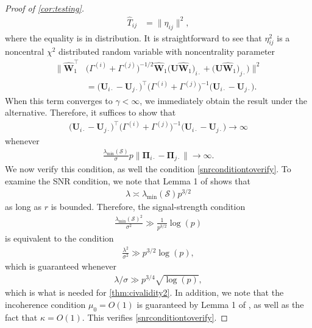 \documentclass[10pt]{article}
\newcommand{\0}{{\mathbf{0}}}
\newcommand{\1}{{\mathbf{1}}}
\newcommand{\U}{{\mathbf{U}}}
\renewcommand{\citet}{\cite}
\renewcommand{\t}{^{\top}}
\renewcommand{\hat}{\widehat}
\renewcommand{\hat}{\widehat}
\begin{document}
\begin{proof}[Proof of \cref{cor:testing}]
\begin{align*}
    \hat T_{ij} &= \| \eta_{ij}  \|^2,
\end{align*}
where the equality is in distribution.  It is straightforward to see that $\eta_{ij}^2$ is a noncentral $\chi^2$ distributed random variable with noncentrality parameter
\begin{align*}
    \|   \mathbf{\hat W}_{1}\t &\bigg( \Gamma^{(i)} + \Gamma^{(j)} \bigg)^{-1/2}  \mathbf{\hat W}_{1}  \big(\U\mathbf{\hat W}_{1}\big)_{i\cdot} + \big( \U \mathbf{\hat W}_{1}\big)_{j\cdot} \big) \|^2\\
    &= \big( \U_{i\cdot} - \U_{j\cdot} \big)\t \bigg( \Gamma^{(i)} + \Gamma^{(j)} \bigg)^{-1}  \big( \U_{i\cdot} - \U_{j\cdot} \big).
\end{align*}
When this term converges to $\gamma < \infty$, we immediately obtain the result under the alternative.  Therefore, it suffices to show that
\begin{align}
     \big( \U_{i\cdot} - \U_{j\cdot} \big)\t \bigg( \Gamma^{(i)} + \Gamma^{(j)} \bigg)^{-1}  \big( \U_{i\cdot} - \U_{j\cdot} \big) \to \infty \label{snronditiontoverify2}
\end{align}
whenever
\begin{align}
    \frac{\lambda_{\min}(\mathcal{S})}{\sigma} p \| \mathbf{\Pi}_{i\cdot} - \mathbf{\Pi}_{j\cdot} \| \to \infty. \label{snrsnr}
\end{align}
We now verify this condition, as well the condition \eqref{snrconditiontoverify}. To examine the SNR condition, we note that Lemma 1 of \citet{agterberg_estimating_2022} shows that
\begin{align*}
    \lambda \asymp \lambda_{\min}(\mathcal{S}) p^{3/2}
\end{align*}
as long as  $r$ is bounded.  Therefore, the signal-strength condition 
\begin{align*}
    \frac{\lambda_{\min}(\mathcal{S})^2}{\sigma^2} \gg \frac{1}{p^{3/2}} \log(p)
\end{align*}
is equivalent to the condition
\begin{align*}
    \frac{\lambda^2}{\sigma^2} \gg p^{3/2} \log(p),
\end{align*}
which is guaranteed whenever
\begin{align*}
    \lambda/\sigma \gg p^{3/4} \sqrt{\log(p)},
\end{align*}
which is what is needed for \cref{thm:civalidity2}.  In addition, we note that the incoherence condition $\mu_0 = O(1)$ is guaranteed by Lemma 1 of \citet{agterberg_estimating_2022}, as well as the fact that $\kappa = O(1)$.  This verifies \eqref{snrconditiontoverify}.


\end{proof}
\end{document}

